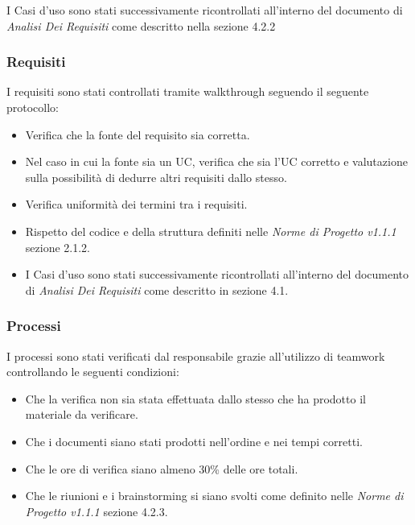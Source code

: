 \documentclass[a4paper]{article}
\begin{document}
				I Casi d'uso sono stati successivamente ricontrollati all'interno del documento di \emph{Analisi Dei Requisiti} come
				descritto nella sezione 4.2.2
			\subsubsection{Requisiti}
				I requisiti sono stati controllati tramite walkthrough seguendo il seguente protocollo:
					\begin{itemize}
						\item Verifica che la fonte del requisito sia corretta.
						\item Nel caso in cui la fonte sia un UC, verifica che sia l’UC corretto e valutazione
	 sulla possibilità di dedurre altri requisiti dallo stesso.
						\item Verifica uniformità dei termini tra i requisiti.
						\item Rispetto del codice e della struttura definiti nelle \emph{Norme di Progetto v1.1.1} sezione 2.1.2.
						\item I Casi d'uso sono stati successivamente ricontrollati all'interno del documento di \emph{Analisi Dei Requisiti} 
						come descritto in sezione 4.1.
					\end{itemize}
			\subsubsection{Processi}
				I processi sono stati verificati dal responsabile grazie all'utilizzo di teamwork controllando le seguenti condizioni:
				\begin{itemize}
					\item Che la verifica non sia stata effettuata dallo stesso che ha prodotto il materiale da verificare.
					\item Che i documenti siano stati prodotti nell'ordine e nei tempi corretti.
					\item Che le ore di verifica siano almeno 30\% delle ore totali.
					\item Che le riunioni e i brainstorming si siano svolti come definito nelle \emph{Norme di Progetto v1.1.1} sezione 4.2.3.
				\end{itemize}
\end{document}

